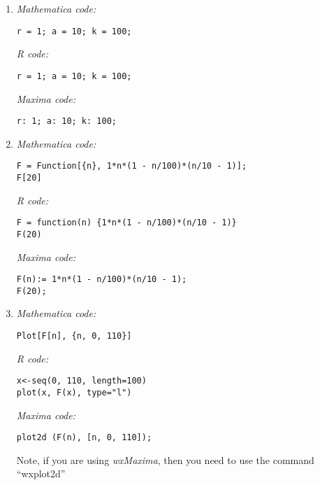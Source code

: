 \documentclass[12pt]{article}
\begin{document}
\begin{enumerate}[label=\alph*]
\item{}
\textit{Mathematica code:}
\lstset{language=Mathematica, basicstyle=\footnotesize} 
\begin{lstlisting}[frame=single]
r = 1; a = 10; k = 100;
\end{lstlisting}

\textit{R code:}
\lstset{language=R, basicstyle=\footnotesize} 
\begin{lstlisting}[frame=single]
r = 1; a = 10; k = 100;
\end{lstlisting}

\textit{Maxima code:}
\lstset{language=Maxima, basicstyle=\footnotesize} 
\begin{lstlisting}[frame=single]
r: 1; a: 10; k: 100;
\end{lstlisting}

\item{}
\textit{Mathematica code:}
\lstset{language=Mathematica, basicstyle=\footnotesize} 
\begin{lstlisting}[frame=single]
F = Function[{n}, 1*n*(1 - n/100)*(n/10 - 1)];
F[20]
\end{lstlisting}

\textit{R code:}
\lstset{language=R, basicstyle=\footnotesize} 
\begin{lstlisting}[frame=single]
F = function(n) {1*n*(1 - n/100)*(n/10 - 1)}
F(20)
\end{lstlisting}

\textit{Maxima code:}
\lstset{language=Maxima, basicstyle=\footnotesize} 
\begin{lstlisting}[frame=single]
F(n):= 1*n*(1 - n/100)*(n/10 - 1);
F(20);
\end{lstlisting}

\item{}
\textit{Mathematica code:}
\lstset{language=Mathematica, basicstyle=\footnotesize} 
\begin{lstlisting}[frame=single]
Plot[F[n], {n, 0, 110}]
\end{lstlisting}

\textit{R code:}
\lstset{language=R, basicstyle=\footnotesize} 
\begin{lstlisting}[frame=single]
x<-seq(0, 110, length=100)
plot(x, F(x), type="l")
\end{lstlisting}

\textit{Maxima code:}
\lstset{language=Maxima, basicstyle=\footnotesize} 
\begin{lstlisting}[frame=single]
plot2d (F(n), [n, 0, 110]);
\end{lstlisting}
Note, if you are using \textit{wxMaxima}, then you need to use the command ``wxplot2d''


\end{enumerate}
\end{document}
